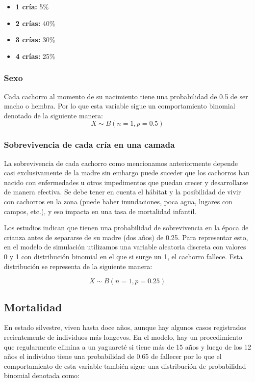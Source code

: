             \begin{itemize}
                \item \textbf{1 cría:} 5\%
                \item \textbf{2 crías:} 40\%
                \item \textbf{3 crías:} 30\%
                \item \textbf{4 crías:} 25\%
            \end{itemize}
        \subsubsection{Sexo}
            Cada cachorro al momento de su nacimiento tiene una probabilidad de 0.5 de ser macho o hembra. Por lo que esta variable sigue un comportamiento binomial denotado de la siguiente manera:
            \begin{equation}
                X \sim B(n=1, p=0.5)
            \end{equation}
        \subsubsection{Sobrevivencia de cada cría en una camada}
            La sobrevivencia de cada cachorro como mencionamos anteriormente depende casi exclusivamente de la madre sin embargo puede suceder que los cachorros han nacido con enfermedades u otros impedimentos que puedan crecer y desarrollarse de manera efectiva. Se debe tener en cuenta el hábitat y la posibilidad de vivir con cachorros en la zona (puede haber inundaciones, poca agua, lugares con campos, etc.), y eso impacta en una tasa de mortalidad infantil.
            
            Los estudios indican que tienen una probabilidad de sobrevivencia en la época de crianza antes de separarse de su madre (dos años) de 0.25. Para representar esto, en el modelo de simulación utilizamos una variable aleatoria discreta con valores 0 y 1 con distribución binomial en el que si surge un 1, el cachorro fallece. Esta distribución se representa de la siguiente manera:

            \begin{equation}
                X \sim B(n=1, p=0.25)
            \end{equation}
            
    \subsection{Mortalidad}
        En estado silvestre, viven hasta doce años, aunque hay algunos casos registrados recientemente de individuos más longevos. En el modelo, hay un procedimiento que regularmente elimina a un yaguareté si tiene más de 15 años y luego de los 12 años el individuo tiene una probabilidad de 0.65 de fallecer por lo que el comportamiento de esta variable también sigue una distribución de probabilidad binomial denotada como:
        
